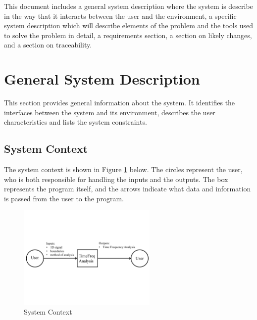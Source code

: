 \documentclass[12pt]{article}
\begin{document}
This document includes a general system description where the system is describe in the way that it interacts between the user and the environment, a specific system description which will describe elements of the problem and the tools used to solve the problem in detail, a requirements section, a section on likely changes, and a section on traceability. 

\section{General System Description}

This section provides general information about the system.  It identifies the
interfaces between the system and its environment, describes the user
characteristics and lists the system constraints.\\ 

\subsection{System Context}

The system context is shown in Figure \ref{Fig_SystemContext} below. The circles represent the user, who is both responsible for handling the inputs and the outputs. The box represents the program itself, and the arrows indicate what data and information is passed from the user to the program. 
\begin{figure}[h!]
\begin{center}
 \includegraphics[width=0.6\textwidth]{SystemContextFigure}
\caption{System Context}
\label{Fig_SystemContext} 
\end{center}
\end{figure}
\end{document}
